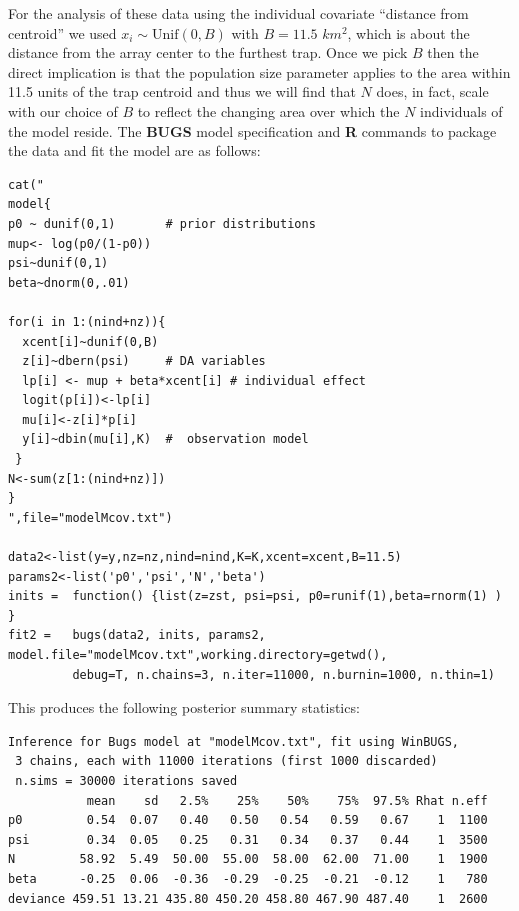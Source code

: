 For the analysis of these data using the individual covariate
``distance from centroid''
we used $x_{i} \sim \mbox{Unif}(0,B)$
with $B = 11.5$ $km^2$, which is about the distance from the
array center to the furthest trap.  Once we pick $B$ then the
direct implication is that the population size parameter applies to
the area within 11.5 units of the trap centroid and thus we will find
that $N$ does, in fact, scale with our choice of $B$ to reflect
the changing area over which the $N$ individuals of the model reside.
The {\bf BUGS} model specification and {\bf R} commands to package the
data and fit the model are as follows:
{\small
\begin{verbatim}
cat("
model{
p0 ~ dunif(0,1)       # prior distributions
mup<- log(p0/(1-p0))
psi~dunif(0,1)
beta~dnorm(0,.01)

for(i in 1:(nind+nz)){
  xcent[i]~dunif(0,B)
  z[i]~dbern(psi)     # DA variables
  lp[i] <- mup + beta*xcent[i] # individual effect
  logit(p[i])<-lp[i]
  mu[i]<-z[i]*p[i]
  y[i]~dbin(mu[i],K)  #  observation model
 }
N<-sum(z[1:(nind+nz)])
}
",file="modelMcov.txt")

data2<-list(y=y,nz=nz,nind=nind,K=K,xcent=xcent,B=11.5)
params2<-list('p0','psi','N','beta')
inits =  function() {list(z=zst, psi=psi, p0=runif(1),beta=rnorm(1) ) }
fit2 =   bugs(data2, inits, params2, model.file="modelMcov.txt",working.directory=getwd(),
         debug=T, n.chains=3, n.iter=11000, n.burnin=1000, n.thin=1)
\end{verbatim}
}
This produces the following posterior summary statistics:
{\small
\begin{verbatim}
Inference for Bugs model at "modelMcov.txt", fit using WinBUGS,
 3 chains, each with 11000 iterations (first 1000 discarded)
 n.sims = 30000 iterations saved
           mean    sd   2.5%    25%    50%    75%  97.5% Rhat n.eff
p0         0.54  0.07   0.40   0.50   0.54   0.59   0.67    1  1100
psi        0.34  0.05   0.25   0.31   0.34   0.37   0.44    1  3500
N         58.92  5.49  50.00  55.00  58.00  62.00  71.00    1  1900
beta      -0.25  0.06  -0.36  -0.29  -0.25  -0.21  -0.12    1   780
deviance 459.51 13.21 435.80 450.20 458.80 467.90 487.40    1  2600
\end{verbatim}
}

